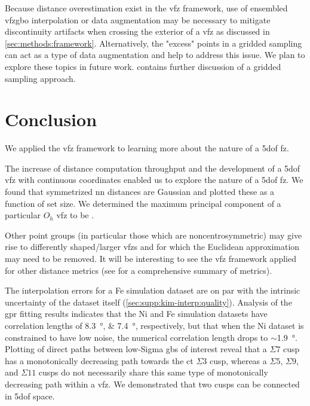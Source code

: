 \documentclass[final,twocolumn,12pt]{elsarticle}
\begin{document}
	Because distance overestimation exist in the \gls{vfz} framework, use of ensembled \gls{vfzgbo} interpolation or data augmentation may be necessary to mitigate discontinuity artifacts when crossing the exterior of a \gls{vfz} as discussed in \cref{sec:methods:framework}. Alternatively, the "excess" points in a gridded sampling can act as a type of data augmentation and help to address this issue. We plan to explore these topics in future work.  contains further discussion of a gridded sampling approach.
	 
	\section{Conclusion} \label{sec:conclusion}
	We applied the \gls{vfz} framework to learning more about the nature of a \gls{5dof} \gls{fz}.

	The increase of distance computation throughput and the development of a \gls{5dof} \gls{vfz} with continuous coordinates enabled us to explore the nature of a \gls{5dof} \gls{fz}. We found that symmetrized \gls{nn} distances are Gaussian and plotted these as a function of set size. We determined the maximum principal component of a particular $O_h$ \gls{vfz} to be \dimOne{}.
	
	Other point groups (in particular those which are noncentrosymmetric) may give rise to differently shaped/larger \glspl{vfz} and for which the Euclidean approximation may need to be removed. It will be interesting to see the \gls{vfz} framework applied for other distance metrics (see \citet{morawiecDistancesGrainInterfaces2019} for a comprehensive summary of metrics).

	The interpolation errors for a Fe simulation dataset are on par with the intrinsic uncertainty of the dataset itself (\cref{sec:supp:kim-interp:quality}). Analysis of the \gls{gpr} fitting results indicates that the Ni and Fe simulation datasets have correlation lengths of \SIlist{8.3;7.4}{\degree}, respectively, but that when the Ni dataset is constrained to have low noise, the numerical correlation length drops to $\sim$\SI{1.9}{\degree}.
	Plotting of direct paths between low-Sigma \glspl{gb} of interest reveal that a $\Sigma$7 cusp has a monotonically decreasing path towards the \gls{ct} $\Sigma3$ cusp, whereas a $\Sigma5$, $\Sigma9$, and $\Sigma11$ cusps do not necessarily share this same type of monotonically decreasing path within a \gls{vfz}. We demonstrated that two cusps can be connected in \gls{5dof} space.
	
\end{document}
